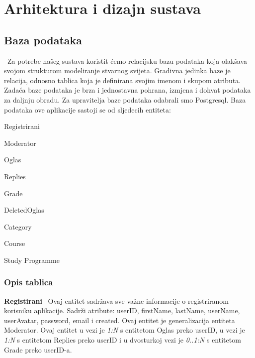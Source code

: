\chapter{Arhitektura i dizajn sustava}
		
		\section{Baza podataka}
			
		\
		Za potrebe našeg sustava koristit ćemo relacijsku bazu podataka koja olakšava svojom strukturom modeliranje stvarnog svijeta. Gradivna jedinka baze je relacija, odnosno tablica koja je definirana svojim imenom i skupom atributa. Zadaća baze podataka je brza i jednostavna pohrana, izmjena i dohvat podataka za daljnju obradu. Za upravitelja baze podataka odabrali smo Postgresql.
        Baza podataka ove aplikacije sastoji se od sljedecih entiteta: 
        
        \begin{packed_item}
						\item Registrirani
						\item Moderator
						\item Oglas
						\item Replies
						\item Grade
						\item DeletedOglas
						\item Category
						\item Course
						\item Study Programme
		\end{packed_item}
		
			\subsection{Opis tablica}
			
				\noindent\textbf{Registirani} \ Ovaj entitet sadržava sve važne informacije o registriranom korisniku aplikacije. Sadrži atribute: userID, firstName, lastName, userName, userAvatar, password, email i created. Ovaj entitet je generalizacija entiteta Moderator. Ovaj entitet u vezi je \textit{1:N} s entitetom Oglas preko userID, u vezi je \textit{1:N} s entitetom Replies preko userID i u dvosturkoj vezi je \textit{0..1:N} s entitetom Grade preko userID-a. 
				
